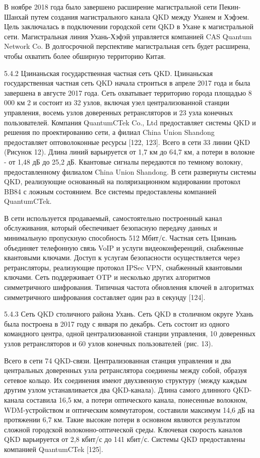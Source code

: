 В ноябре 2018 года было завершено расширение магистральной сети Пекин-Шанхай путем создания магистрального канала QKD между Уханем и Хэфэем. Цель заключалась в подключении городской сети QKD в Ухане к магистральной сети. Магистральная линия Ухань-Хэфэй управляется компанией CAS Quantum Network Co. В долгосрочной перспективе магистральная сеть будет расширена, чтобы охватить более обширную территорию Китая.

5.4.2 Цзинаньская государственная частная сеть QKD. Цзинаньская государственная частная сеть QKD начала строиться в апреле 2017 года и была завершена в августе 2017 года. Сеть охватывает территорию города площадью 8 000 км 2 и состоит из 32 узлов, включая узел централизованной станции управления, восемь узлов доверенных ретрансляторов и 23 узла конечных пользователей. Компания QuantumCTek Co., Ltd предоставляет системы QKD и решения по проектированию сети, а филиал China Union Shandong предоставляет оптоволоконные ресурсы [122, 123]. Всего в сети 33 линии QKD (Рисунок 12). Длина линий варьируется от 1,7 км до 64,7 км, а потери в волокне - от 1,48 дБ до 25,2 дБ. Квантовые сигналы передаются по темному волокну, предоставленному филиалом China Union Shandong.
В сети развернуты системы QKD, реализующие основанный на поляризационном кодировании протокол BB84 с ложным состоянием. Все системы предоставлены компанией QuantumCTek.

В сети используется продаваемый, самостоятельно построенный канал обслуживания, который обеспечивает безопасную передачу данных и минимальную пропускную способность 512 Мбит/с. Частная сеть Цзинань объединяет телефонную связь VoIP и услуги видеоконференций, снабженные квантовыми ключами. Доступ к услугам безопасности осуществляется через ретрансляторы, реализующие протокол IPSec VPN, снабженный квантовыми ключами.
Сеть поддерживает OTP и несколько других алгоритмов симметричного шифрования. Типичная частота обновления ключей в алгоритмах симметричного шифрования составляет один раз в секунду [124].

5.4.3 Сеть QKD столичного района Ухань. Сеть QKD в столичном округе Ухань была построена в 2017 году с января по декабрь. Сеть состоит из одного командного центра, одной централизованной станции управления, 10 доверенных узлов ретрансляторов и 60 узлов конечных пользователей (рис. 13).

Всего в сети 74 QKD-связи. Централизованная станция управления и два центральных доверенных узла ретранслятора соединены между собой, образуя сетевое кольцо. Их соединения имеют двухзвенную структуру (между каждым другим узлом устанавливается два QKD-канала). Длина самого длинного QKD-канала составила 16,5 км, а потери оптического канала, понесенные волокном, WDM-устройством и оптическим коммутатором, составили максимум 14,6 дБ на протяжении 6,7 км. Такие высокие потери в основном являются результатом сложной городской волоконно-оптической среды. Ключевая скорость каналов QKD варьируется от 2,8 кбит/с до 141 кбит/с. Системы QKD предоставлены компанией QuantumCTek [125].

